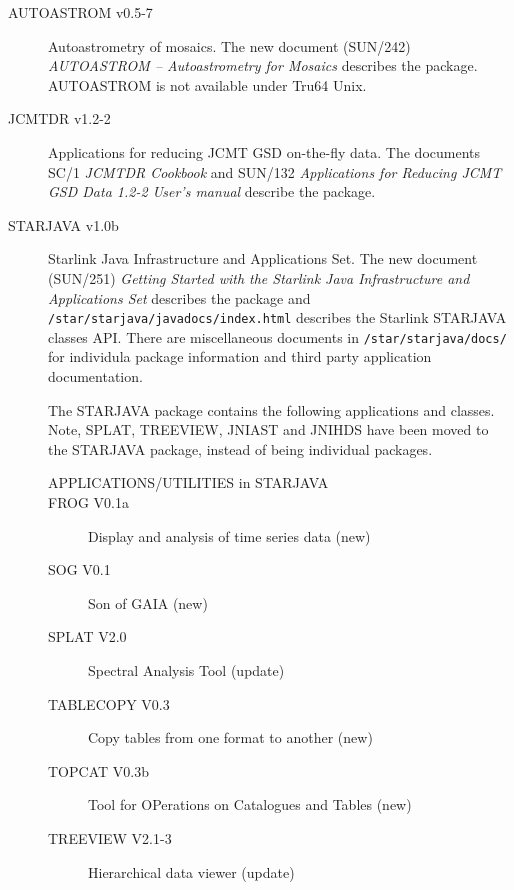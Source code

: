 \documentclass[twoside,11pt]{article}
\newcommand{\xref}[3]{#1}
\renewcommand{\_}{\texttt{\symbol{95}}}
\begin{document}
\begin{description}


\item[AUTOASTROM v0.5-7] Autoastrometry of mosaics. The new document (SUN/242) 
\textit{\xref{AUTOASTROM -- Autoastrometry for Mosaics}{sun242}{}\/}
describes the package. AUTOASTROM is not available under Tru64 Unix.

\item[JCMTDR v1.2-2] Applications for reducing JCMT GSD on-the-fly data.
The documents SC/1 \textit{\xref{JCMTDR Cookbook}{sc1}{}\/} and 
SUN/132 \textit{\xref{Applications for Reducing JCMT GSD Data 1.2-2 User's manual}{sun132}{}\/} 
describe the package.

\item[STARJAVA v1.0b] Starlink Java Infrastructure and Applications Set.
The new document (SUN/251) 
\textit{\xref{Getting Started with the Starlink Java Infrastructure 
and Applications Set}{sun251}{}\/}
describes the package and \texttt{/star/starjava/javadocs/index.html} 
describes the Starlink STARJAVA classes API. There are miscellaneous
documents in \texttt{/star/starjava/docs/} for individula package information and
third party application documentation.
 
The STARJAVA package contains the following applications and classes. Note,
SPLAT, TREEVIEW, JNIAST and JNIHDS have been moved to the STARJAVA
package, instead of being individual packages.

\begin{description}
\item[APPLICATIONS/UTILITIES in STARJAVA]
\item[ FROG V0.1a] Display and analysis of time series data (new)
\item[ SOG V0.1] Son of GAIA (new)
\item[ SPLAT V2.0] Spectral Analysis Tool (update)
\item[ TABLECOPY V0.3] Copy tables from one format to another (new)
\item[ TOPCAT V0.3b] Tool for OPerations on Catalogues and Tables (new)
\item[ TREEVIEW V2.1-3] Hierarchical data viewer (update)


\end{description}
\end{description}
\end{document}
